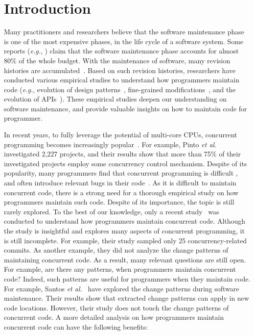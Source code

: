 \section{Introduction}
\label{sec:intro}
Many practitioners and researchers believe that the software maintenance phase is one of the most expensive phases, in the life cycle of a software system. Some reports (\emph{e.g.}, \cite{ahn2003software}) claim that the software maintenance phase accounts for almost 80\% of the whole budget. With the maintenance of software, many revision histories are accumulated~\cite{conf/icsm/Borges16}. Based on such revision histories, researchers have conducted various empirical studies to understand how programmers maintain code (\emph{e.g.}, evolution of design patterns~\cite{aversano2007empirical}, fine-grained modifications~\cite{german2006empirical}, and the evolution of APIs~\cite{mcdonnell2013empirical}). These empirical studies deepen our understanding on software maintenance, and provide valuable insights on how to maintain code for programmer.

In recent years, to fully leverage the potential of multi-core CPUs, concurrent programming becomes increasingly popular~\cite{journals/jss/PintoTFFB15}. For example, Pinto \emph{et al.}~\cite{journals/jss/PintoTFFB15} investigated 2,227 projects, and their results show that more than 75\% of their investigated projects employ some concurrency control mechanism. Despite of its popularity, many programmers find that concurrent programming is difficult \cite{journals/corr/McKenney17}, and often introduce relevant bugs in their code~\cite{conf/asplos/LuPSZ08}. As it is difficult to maintain concurrent code, there is a strong need for a thorough empirical study on how programmers maintain such code. Despite of its importance, the topic is still rarely explored. To the best of our knowledge, only a recent study~\cite{conf/sigsoft/GuJSZL15} was conducted to understand how programmers maintain concurrent code. Although the study is insightful and explores many aspects of concurrent programming, it is still incomplete. For example, their study sampled only 25 concurrency-related commits. As another example, they did not analyze the change patterns of maintaining concurrent code. As a result, many relevant questions are still open. For example, are there any patterns, when programmers maintain concurrent code? Indeed, such patterns are useful for programmers when they maintain code. For example, Santos \emph{et al.}~\cite{conf/icsm/SantosAEDV15} have explored the change patterns during software maintenance. Their results show that extracted change patterns can apply in new code locations. However, their study does not touch the change patterns of concurrent code. A more detailed analysis on how programmers maintain concurrent code can have the following benefits:





